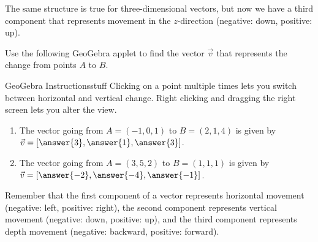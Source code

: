 \documentclass{ximera}
\begin{document}
The same structure is true for three-dimensional vectors, but now we have a third component that represents movement in the $z$-direction (negative: down, positive: up).

\begin{problem}
    Use the following GeoGebra applet to find the vector $\vec{v}$ that represents the change from points $A$ to $B$. 
    
    \begin{expandable}{GeoGebra Instructions}{stuff}
        Clicking on a point multiple times lets you switch between horizontal and vertical change. Right clicking and dragging the right screen lets you alter the view.
    \end{expandable}

    \begin{center}
    \end{center}

    \begin{enumerate}
        \item The vector going from $A=(-1,0,1)$ to $B=(2,1,4)$ is given by $\vec{v}=[\answer{3},\answer{1},\answer{3}]$.
        \item The vector going from $A=(3,5,2)$ to $B=(1,1,1)$ is given by $\vec{v}=[\answer{-2},\answer{-4},\answer{-1}]$.
    \end{enumerate}
    \begin{feedback}
        Remember that the first component of a vector represents horizontal movement (negative: left, positive: right), the second component represents vertical movement (negative: down, positive: up), and the third component represents depth movement (negative: backward, positive: forward).
    \end{feedback}
\end{problem}
\end{document}
